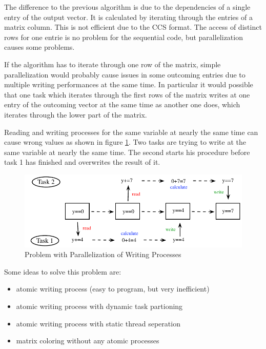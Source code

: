 \documentclass[a4paper,11pt]{scrartcl}
\begin{document}
The difference to the previous algorithm is due to the dependencies of a single
entry of the output vector. It is calculated by iterating through the entries
of a matrix column. This is not efficient due to the CCS format.
The access of distinct rows for one entrie is no problem for the sequential
code, but parallelization causes some problems.

If the algorithm has to iterate through one row of the matrix, simple 
parallelization would probably cause issues in some outcoming entries
due to multiple writing performances at the same time. In particular it would
possible that one task which iterates through the first rows of the matrix
writes at one entry of the outcoming vector at the same time as another one
does, which iterates through the lower part of the matrix.

Reading and writing processes for the same variable at nearly the same 
time can cause wrong values as shown in figure \ref{figure:parallelwriting}. Two
tasks are trying to write at the same variable at nearly the same time. The second
starts his procedure before task 1 has finished and overwrites the result of it.

\begin{figure}[ht]
\label{figure:parallelwriting}
\includegraphics{graphic/parallel_writing_problem.pdf}
\caption{Problem with Parallelization of Writing Processes}
\end{figure}

Some ideas to solve this problem are:

\begin{itemize}

\item atomic writing process (easy to program, but very inefficient)
\item atomic writing process with dynamic task partioning
\item atomic writing process with static thread seperation
\item matrix coloring without any atomic processes

\end{itemize}
\end{document}
